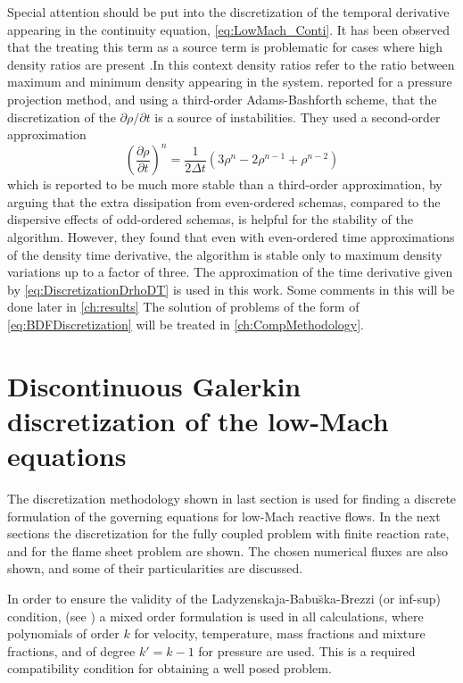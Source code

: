 Special attention should be put into the discretization of the temporal derivative appearing in the continuity equation, \cref{eq:LowMach_Conti}. It has been observed that the treating this term as a source term is problematic  for cases where high density ratios are present \parencite{cookDirectNumericalSimulation1996,nicoudConservativeHighOrderFiniteDifference2000}.In this context density ratios refer to the ratio between maximum and minimum density appearing in the system. \textcite{cookDirectNumericalSimulation1996} reported for a pressure projection method, and using a third-order Adams-Bashforth scheme, that the discretization of the $\partial \rho /\partial t$ is a source of instabilities. They used a second-order approximation
\begin{equation}
	\left(\frac{\partial \rho}{\partial t} \right)^n= \frac{1}{2\Delta t}\left(3\rho^n-2\rho^{n-1}+\rho^{n-2}\right) \label{eq:DiscretizationDrhoDT}
\end{equation}
which is reported to be much more stable than a third-order approximation, by arguing that the extra dissipation from even-ordered schemas, compared to the dispersive effects of odd-ordered schemas, is helpful for the stability of the algorithm. However, they found that even with even-ordered time approximations of the density time derivative, the algorithm is stable only to maximum density variations up to a factor of three. The approximation of the time derivative given by \cref{eq:DiscretizationDrhoDT} is used in this work. Some comments in this will be done later in \cref{ch:results}
The solution of problems of the form of \cref{eq:BDFDiscretization} will be treated in \cref{ch:CompMethodology}.
\section{Discontinuous Galerkin discretization of the low-Mach equations}
The discretization methodology shown in last section is used for finding a discrete formulation of the governing equations for low-Mach reactive flows. In the next sections the discretization for the fully coupled problem with finite reaction rate, and for the flame sheet problem are shown. The chosen numerical fluxes are also shown, and some of their particularities are discussed. 

In order to ensure the validity  of the  Ladyzenskaja-Babu\u{s}ka-Brezzi (or inf-sup) condition, (see \textcite{babuskaFiniteElementMethod1973})  a mixed order formulation is used in all calculations, where polynomials of order $k$ for velocity, temperature, mass fractions and mixture fractions, and of degree $k' = k-1$ for pressure are used. This is a required compatibility condition for obtaining a well posed problem. 
